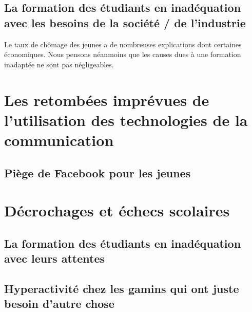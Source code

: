 \subsection{La formation des étudiants en inadéquation avec les besoins de la société / de l'industrie}
Le taux de chômage des jeunes a de nombreuses explications dont certaines économiques. Nous pensons néanmoins que les causes dues à une formation inadaptée ne sont pas négligeables.



\section{Les retombées imprévues de l'utilisation des technologies de la communication}

\subsection{Piège de Facebook pour les jeunes}



\section{Décrochages et échecs scolaires}
\subsection{La formation des étudiants en inadéquation avec leurs attentes}


\subsection{Hyperactivité chez les gamins qui ont juste besoin d'autre chose}

